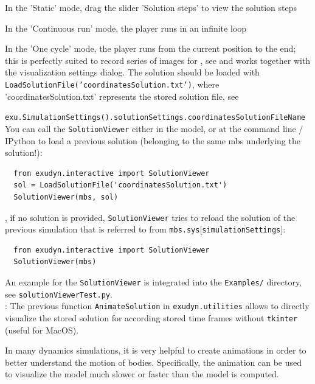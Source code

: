 \item In the 'Static' mode, drag the slider 'Solution steps' to view the solution steps
\item In the 'Continuous run' mode, the player runs in an infinite loop
\item In the 'One cycle' mode, the player runs from the current position to the end; this is perfectly suited to record series of images for , see  and works together with the visualization settings dialog.
\ei
The solution should be loaded with
\texttt{LoadSolutionFile('coordinatesSolution.txt')}, where 'coordinatesSolution.txt' represents the stored solution file, 
see 
\bi
  \item \texttt{exu.SimulationSettings().solutionSettings.coordinatesSolutionFileName}
\ei
You can call the \texttt{SolutionViewer} either in the model, or at the command line / IPython to load a previous solution (belonging to the same mbs underlying the solution!):
\pythonstyle\begin{lstlisting}
  from exudyn.interactive import SolutionViewer
  sol = LoadSolutionFile('coordinatesSolution.txt')
  SolutionViewer(mbs, sol)
\end{lstlisting}
%
, if no solution is provided, \texttt{SolutionViewer} tries to reload the solution of the previous simulation that is referred to from \texttt{mbs.sys$[$simulationSettings$]$}:
\pythonstyle\begin{lstlisting}
  from exudyn.interactive import SolutionViewer
  SolutionViewer(mbs)
\end{lstlisting}
An example for the \texttt{SolutionViewer} is integrated into the \texttt{Examples/} directory, see \texttt{solutionViewerTest.py}. \\
: The previous function \texttt{AnimateSolution} in \texttt{exudyn.utilities} allows to directly visualize the stored solution for according stored time frames without \texttt{tkinter} (useful for MacOS).

\label{secGeneratingAnimations}
%
In many dynamics simulations, it is very helpful to create animations in order to better understand the motion of bodies. Specifically, the animation can be used to visualize the model much slower or faster than the model is computed.

